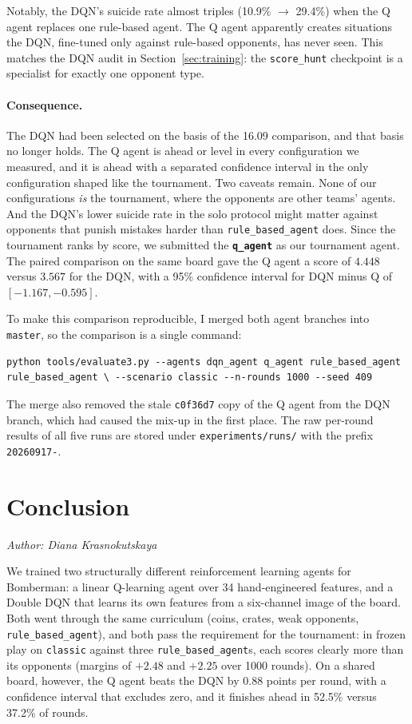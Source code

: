 \documentclass[11pt]{article}
\newcommand{\authorline}[1]{\noindent\textit{Author: #1}\par\medskip}
\newcommand{\code}[1]{\texttt{#1}}
\begin{document}
Notably, the DQN's suicide rate almost triples (10.9\% $\rightarrow$ 29.4\%) when the Q
agent replaces one rule-based agent. The Q agent apparently creates situations the DQN,
fine-tuned only against rule-based opponents, has never seen. This matches the DQN audit in
Section~\ref{sec:training}: the \code{score\_hunt} checkpoint is a specialist for exactly one
opponent type.

\paragraph{Consequence.}
The DQN had been selected on the basis of the 16.09 comparison, and that basis no longer
holds. The Q agent is ahead or level in every configuration we measured, and it is ahead
with a separated confidence interval in the only configuration shaped like the tournament.
Two caveats remain. None of our configurations \emph{is} the tournament, where the opponents
are other teams' agents. And the DQN's lower suicide rate in the solo protocol might matter
against opponents that punish mistakes harder than \code{rule\_based\_agent} does. Since the
tournament ranks by score, we submitted the \textbf{\code{q\_agent}} as our tournament
agent. The paired comparison on the same board gave the Q agent a score of $4.448$ versus
$3.567$ for the DQN, with a 95\% confidence interval for DQN minus Q of
$[-1.167,-0.595]$.

To make this comparison reproducible, I merged both agent branches into \code{master}, so
the comparison is a single command:
\begin{lstlisting}
python tools/evaluate3.py --agents dqn_agent q_agent rule_based_agent 
rule_based_agent \ --scenario classic --n-rounds 1000 --seed 409
\end{lstlisting}
The merge also removed the stale \code{c0f36d7} copy of the Q agent from the DQN branch,
which had caused the mix-up in the first place. The raw per-round results of all five runs
are stored under \code{experiments/runs/} with the prefix \code{20260917-}.

\section{Conclusion}
\authorline{Diana Krasnokutskaya}

We trained two structurally different reinforcement learning agents for Bomberman: a linear Q-learning agent over 34 hand-engineered features, and a Double DQN that learns its own features from a six-channel image of the board. Both went through the same curriculum (coins, crates, weak opponents, \code{rule\_based\_agent}), and both pass the requirement for the tournament: in frozen play on \code{classic} against three \code{rule\_based\_agent}s, each scores clearly more than its opponents (margins of $+2.48$ and $+2.25$ over 1000 rounds). On a shared board, however, the Q agent beats the DQN by 0.88 points per round, with a confidence interval that excludes zero, and it finishes ahead in 52.5\% versus 37.2\% of rounds.
\end{document}
